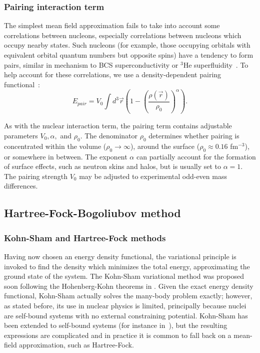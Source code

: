 \subsubsection{Pairing interaction term}
The simplest mean field approximation fails to take into account some correlations between nucleons, especially correlations between nucleons which occupy nearby states. Such nucleons (for example, those occupying orbitals with equivalent orbital quantum numbers but opposite spins) have a tendency to form pairs, similar in mechanism to BCS superconductivity or $^3$He superfluidity~\cite{brink2005}. To help account for these correlations, we use a density-dependent pairing functional~\cite{chasman1976}:
\begin{equation}
E_{pair} = V_0 \int d^3\vec{r} \left( 1-\left(\frac{\rho(\vec{r})}{\rho_0}\right)^\alpha \right).
\end{equation}

\noindent As with the nuclear interaction term, the pairing term contains adjustable parameters $V_0, \alpha,$ and $\rho_0$. The denominator $\rho_0$ determines whether pairing is concentrated within the volume ($\rho_0\rightarrow\infty$), around the surface ($\rho_0\approx0.16$ fm$^{-3}$), or somewhere in between. The exponent $\alpha$ can partially account for the formation of surface effects, such as neutron skins and halos, but is usually set to $\alpha=1$. The pairing strength $V_0$ may be adjusted to experimental odd-even mass differences.

\subsection{Hartree-Fock-Bogoliubov method}\label{sect:HFB}
\subsubsection{Kohn-Sham and Hartree-Fock methods}

Having now chosen an energy density functional, the variational principle is invoked to find the density which minimizes the total energy, approximating the ground state of the system. The Kohn-Sham variational method was proposed soon following the Hohenberg-Kohn theorems in \cite{Kohn1965}. Given the exact energy density functional, Kohn-Sham actually solves the many-body problem exactly; however, as stated before, its use in nuclear physics is limited, principally because nuclei are self-bound systems with no external constraining potential. Kohn-Sham has been extended to self-bound systems (for instance in~\cite{engel2007,barnea2007,messud2009}), but the resulting expressions are complicated and in practice it is common to fall back on a mean-field approximation, such as Hartree-Fock.

